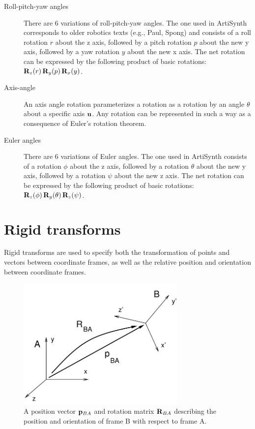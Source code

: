 \begin{description}

\item[Roll-pitch-yaw angles]\mbox{}

There are 6 variations of roll-pitch-yaw angles. The one used in
ArtiSynth corresponds to older robotics texts (e.g., Paul, Spong) and
consists of a roll rotation $r$ about the z axis, followed by a pitch
rotation $p$ about the new y axis, followed by a yaw rotation $y$
about the new x axis. The net rotation can be expressed by the
following product of basic rotations: ${\bf R}_z(r) \, {\bf R}_y(p) \, {\bf R}_x(y)$.

\item[Axis-angle]\mbox{}

An axis angle rotation parameterizes a rotation as a rotation by
an angle $\theta$ about a specific axis ${\bf u}$. Any rotation
can be represented in such a way as a consequence of Euler's rotation
theorem.

\item[Euler angles]\mbox{}

There are 6 variations of Euler angles. The one used in ArtiSynth
consists of a rotation $\phi$ about the z axis, followed by a rotation
$\theta$ about the new y axis, followed by a rotation $\psi$ about the
new z axis. The net rotation can be expressed by the following product
of basic rotations: ${\bf R}_z(\phi) \, {\bf R}_y(\theta) \, {\bf R}_z(\psi)$.

\end{description}

\section{Rigid transforms}
\label{RigidTransforms:sec}

Rigid transforms are used to specify both the transformation of points
and vectors between coordinate frames, as well as the relative
position and orientation between coordinate frames.

\begin{figure}[ht]
\begin{center}
 \includegraphics[width=3.25in]{images/framesAB}
\end{center}
\caption{A position vector ${\bf p}_{BA}$ and rotation matrix
${\bf R}_{BA}$ describing the position and orientation of frame B
with respect to frame A.}
\label{framesAB:fig}
\end{figure}

